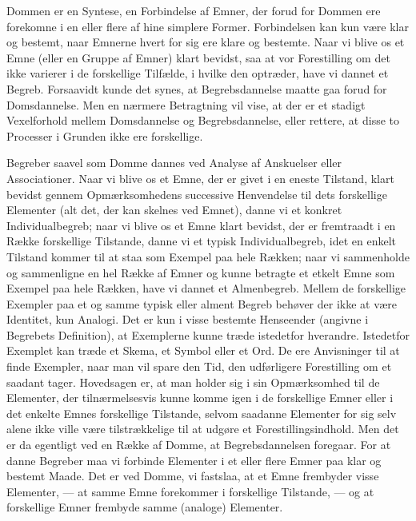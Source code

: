 \documentclass[12pt,a4paper]{book}
\newcommand{\apage}[1]{\marginnote{\footnotesize\textit{[#1]}}}
\begin{document}
Dommen er en Syntese, en Forbindelse af Emner, der forud for Dommen ere
forekomne i en eller flere af hine simplere Former. Forbindelsen kan kun
være klar og bestemt, naar Emnerne hvert for sig ere klare og bestemte.
Naar vi blive os et Emne (eller en Gruppe af Emner) klart bevidst, saa
at vor Forestilling om det ikke varierer i de forskellige Tilfælde, i
hvilke den optræder, have vi dannet et Begreb. Forsaavidt kunde det
synes, at Begrebsdannelse maatte gaa forud for Domsdannelse. Men en
nærmere Betragtning vil vise, at der er et stadigt Vexelforhold mellem
Domsdannelse og Begrebsdannelse, eller rettere, at disse to Processer i
Grunden ikke ere forskellige.

Begreber saavel som Domme dannes ved Analyse af Anskuelser eller
Associationer. Naar vi blive os et Emne, der er givet i en eneste
Tilstand, klart bevidst gennem Opmærksomhedens successive Henvendelse
til dets forskellige Elementer (alt det, der kan skelnes ved Emnet),
danne vi et konkret Individualbegreb; naar vi blive os et Emne klart
bevidst, der er fremtraadt i en Række forskellige Tilstande, danne vi et
typisk Individualbegreb, idet en enkelt Tilstand kommer til at staa som
Exempel paa hele Rækken; naar vi sammenholde og sammenligne en hel Række
af Emner og kunne betragte et etkelt Emne som Exempel paa hele Rækken,
have vi dannet et Almenbegreb. Mellem de forskellige \apage{72} Exempler paa et og
samme typisk eller alment Begreb behøver der ikke at være Identitet, kun
Analogi. Det er kun i visse bestemte Henseender (angivne i Begrebets
Definition), at Exemplerne kunne træde istedetfor hverandre. Istedetfor
Exemplet kan træde et Skema, et Symbol eller et Ord. De ere Anvisninger
til at finde Exempler, naar man vil spare den Tid, den udførligere
Forestilling om et saadant tager. Hovedsagen er, at man holder sig i sin
Opmærksomhed til de Elementer, der tilnærmelsesvis kunne komme igen i de
forskellige Emner eller i det enkelte Emnes forskellige Tilstande,
selvom saadanne Elementer for sig selv alene ikke ville være
tilstrækkelige til at udgøre et Forestillingsindhold. Men det er da
egentligt ved en Række af Domme, at Begrebsdannelsen foregaar. For at
danne Begreber maa vi forbinde Elementer i et eller flere Emner paa klar
og bestemt Maade. Det er ved Domme, vi fastslaa, at et Emne frembyder
visse Elementer, --- at samme Emne forekommer i forskellige Tilstande,
--- og at forskellige Emner frembyde samme (analoge) Elementer.
\end{document}
